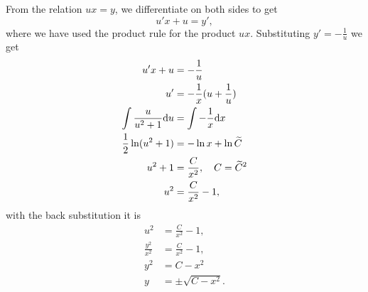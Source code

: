 {\begin{itemize}
From the relation $ux = y$, we differentiate on both sides to get
$$
u' x + u = y',
$$
where we have used the product rule for the product $ux$.
Substituting $y'=-\frac{1}{u}$ we get
\begin{align*}
u'x + u &= - \frac{1}{u}\\
u' &= -\frac{1}{x} (u+\frac{1}{u})\\
\int \frac{u}{u^2+1}\mathrm{d} u &= \int -\frac{1}{x}\mathrm{d} x\\
\frac{1}{2}\ln (u^2+1) &= -\ln x + \ln \widetilde C\\
u^2+1 &= \frac{C}{x^2}, \quad C=\widetilde C^2\\
u^2 &= \frac{C}{x^2}-1,
\end{align*}
with the back substitution it is
\begin{align*}
u^2 &= \frac{C}{x^2}-1,\\
\frac{y^2}{x^2} &= \frac{C}{x^2}-1,\\
y^2 & = C -x^2\\
y&=\pm \sqrt{C-x^2}.
\end{align*}

\end{itemize}
}



